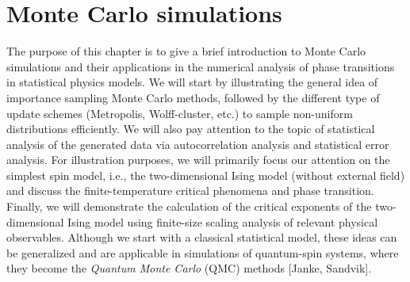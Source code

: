 \documentclass[../thesis_main.tex]{subfiles}
\begin{document}
\chapter{Monte Carlo simulations}
The purpose of this chapter is to give a brief introduction to Monte Carlo simulations and their applications in the numerical analysis of phase transitions in statistical physics models. We will start by illustrating the general idea of importance sampling Monte Carlo methods, followed by the different type of update schemes (Metropolis, Wolff-cluster, etc.) to sample non-uniform distributions efficiently. We will also pay attention to the topic of statistical analysis of the generated data via autocorrelation analysis and statistical error analysis. For illustration purposes, we will primarily focus our attention on the simplest spin model, i.e., the two-dimensional Ising model (without external field) and discuss the finite-temperature critical phenomena and phase transition. Finally, we will demonstrate the calculation of the critical exponents of the two-dimensional Ising model using finite-size scaling analysis of relevant physical observables. Although we start with a classical statistical model, these ideas can be generalized and are applicable in simulations of quantum-spin systems, where they become the \textit{Quantum Monte Carlo} (QMC) methods [Janke, Sandvik]. 
\end{document}
